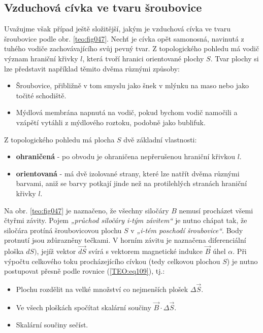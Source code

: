       \subsection{Vzduchová cívka ve tvaru šroubovice}
        Uvažujme však případ ještě složitější, jakým je vzduchová cívka ve tvaru šroubovice podle 
        obr. \ref{teo:fig047}. Nechť je cívka opět samonosná, navinutá z tuhého 
        vodiče zachovávajícího svůj pevný tvar. Z topologického pohledu má vodič význam hraniční 
        křivky \(l\), která tvoří hranici orientované plochy \(S\). Tvar plochy si lze představit 
        například těmito dvěma různými způsoby:


        \begin{itemize}[noitemsep]
          \item Šroubovice, přibližně v tom smyslu jako šnek v mlýnku na maso nebo jako točité 
                schodiště.          
          \item Mýdlová membrána napnutá na vodič, pokud bychom vodič namočili a vzápětí vytáhli
                z mýdlového roztoku, podobně jako bublifuk.
        \end{itemize}
        Z topologického pohledu má plocha \(S\) dvě základní vlastnosti:
        \begin{itemize}[noitemsep]
          \item \textbf{ohraničená} - po obvodu je ohraničena nepřerušenou hraniční křivkou \(l\).
          \item \textbf{orientovaná} - má dvě izolované strany, které lze natřít dvěma různými 
                barvami, aniž se barvy potkají jinde než na protilehlých stranách hraniční křivky 
                \(l\).
        \end{itemize}
         
        Na obr. \ref{teo:fig047} je naznačeno, že všechny siločáry \(B\) nemusí procházet všemi
        čtyřmi závity. Pojem \emph{„průchod siločáry i-tým závitem“} je nutno chápat tak, že
        siločára protíná šroubovicovou plochu \(S\) v \emph{„i-tém poschodí šroubovice“}. Body
        protnutí jsou zdůrazněny tečkami. V horním závitu je naznačena diferenciální ploška \(dS)\),
        jejíž vektor \(\vec{dS}\) svírá s vektorem magnetické indukce \(\vec{B}\) úhel \(\alpha\).
        Při výpočtu celkového toku procházejícího cívkou (tedy celkovou plochou \(S\)) je nutno
        postupovat přesně podle rovnice (\ref{TEO:eq109}), tj.:
        \begin{itemize}[noitemsep]
          \item Plochu rozdělit na velké množství co nejmenších plošek \(\Delta\vec{S}\).
          \item Ve všech ploškách spočítat skalární součiny \(\vec{B}\cdot\Delta\vec{S}\).
          \item Skalární součiny sečíst.
        \end{itemize}
        
